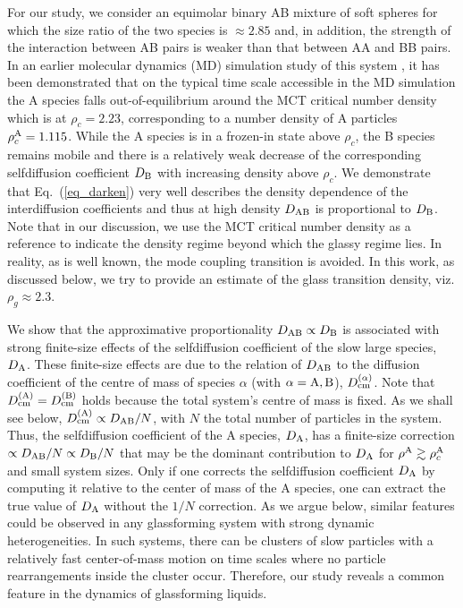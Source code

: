 For our study, we consider an equimolar binary AB mixture of soft spheres for which the size ratio of the two species is $\approx 2.85$ and, in addition, the strength of the interaction between AB pairs is weaker than that between AA and BB pairs. In an earlier molecular dynamics (MD) simulation study of this system \cite{horbach2009}, it has been demonstrated that on the typical time scale accessible in the MD simulation the A species falls out-of-equilibrium around the MCT critical number density which is at $\rho_c = 2.23$, corresponding to a number density of A particles $\rho_{c}^{\rm A}=1.115$.  While the A species is in a frozen-in state above $\rho_c$, the B species remains mobile and there is a relatively weak decrease of the corresponding selfdiffusion coefficient $D_{\rm B}$ with increasing density above $\rho_c$. We demonstrate that Eq.~(\ref{eq_darken}) very well describes the  density dependence of the interdiffusion coefficients and thus at high density $D_{\rm AB}$ is proportional to $D_{\rm B}$. Note that in our discussion, we use the MCT critical number density as a reference to indicate the density regime beyond which the glassy regime lies. In reality, as is well known, the mode coupling transition is avoided. In this work, as discussed below, we try to provide an estimate of the glass transition density, viz. $\rho_g\approx{2.3}$.

We show that the approximative proportionality $D_{\rm AB} \propto D_{\rm B}$ is associated with strong finite-size effects of the selfdiffusion coefficient of the slow large species, $D_{\rm A}$. These finite-size effects are due to the relation of $D_{\rm AB}$ to the diffusion coefficient of the centre of mass of species $\alpha$ (with $\alpha = {\rm A, B}$), $D_{\rm cm}^{(\alpha)}$. Note that $D_{\rm cm}^{\rm (A)} = D_{\rm cm}^{\rm (B)}$ holds because the total system's centre of mass is fixed.  As we shall see below, $D_{\rm cm}^{\rm (A)} \propto D_{\rm AB}/N$, with $N$ the total number of particles in the system. Thus, the selfdiffusion coefficient of the A species, $D_{\rm A}$, has a finite-size correction $\propto D_{\rm AB}/N \propto D_{\rm B}/N$ that may be the dominant contribution to $D_{\rm A}$ for $\rho^{\rm A} \gtrsim \rho_{c}^{\rm A}$ and small system sizes. Only if one corrects the selfdiffusion coefficient $D_{\rm A}$ by computing it relative to the center of mass of the A species, one can extract the true value of $D_{\rm A}$ without the $1/N$ correction. As we argue below, similar features could be observed in any glassforming system with strong dynamic heterogeneities.  In such systems, there can be clusters of slow particles with a relatively fast center-of-mass motion on time scales where no particle rearrangements inside the cluster occur. Therefore, our study reveals a common feature in the dynamics of glassforming liquids.

